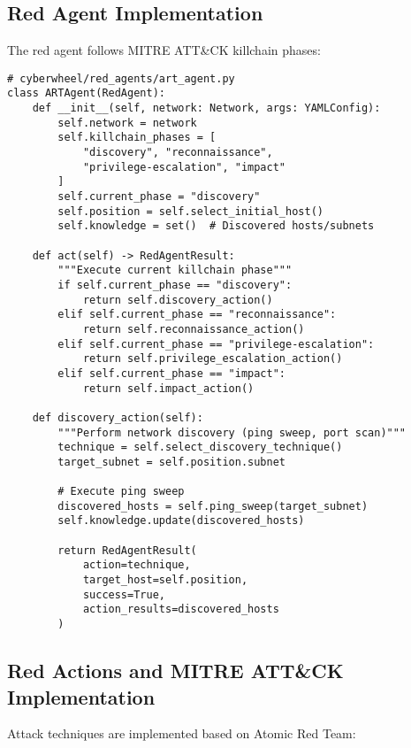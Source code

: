 \documentclass[12pt,a4paper]{article}
\begin{document}
\subsection{Red Agent Implementation}
The red agent follows MITRE ATT\&CK killchain phases:

\begin{lstlisting}[caption=ART Agent Implementation]
# cyberwheel/red_agents/art_agent.py
class ARTAgent(RedAgent):
    def __init__(self, network: Network, args: YAMLConfig):
        self.network = network
        self.killchain_phases = [
            "discovery", "reconnaissance", 
            "privilege-escalation", "impact"
        ]
        self.current_phase = "discovery"
        self.position = self.select_initial_host()
        self.knowledge = set()  # Discovered hosts/subnets
        
    def act(self) -> RedAgentResult:
        """Execute current killchain phase"""
        if self.current_phase == "discovery":
            return self.discovery_action()
        elif self.current_phase == "reconnaissance":
            return self.reconnaissance_action()
        elif self.current_phase == "privilege-escalation":
            return self.privilege_escalation_action()
        elif self.current_phase == "impact":
            return self.impact_action()
            
    def discovery_action(self):
        """Perform network discovery (ping sweep, port scan)"""
        technique = self.select_discovery_technique()
        target_subnet = self.position.subnet
        
        # Execute ping sweep
        discovered_hosts = self.ping_sweep(target_subnet)
        self.knowledge.update(discovered_hosts)
        
        return RedAgentResult(
            action=technique,
            target_host=self.position,
            success=True,
            action_results=discovered_hosts
        )
\end{lstlisting}

\subsection{Red Actions and MITRE ATT\&CK Implementation}
Attack techniques are implemented based on Atomic Red Team:
\end{document}
